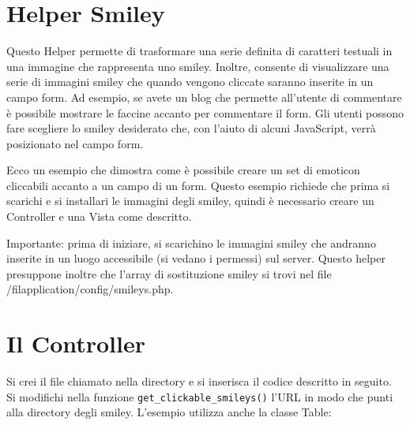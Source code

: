 \section{Helper Smiley}
\label{helper:smiley}

Questo Helper permette di trasformare una serie definita di caratteri testuali in una immagine che rappresenta uno smiley. Inoltre, consente di visualizzare una serie di immagini smiley che quando vengono cliccate saranno inserite in un campo form. Ad esempio, se avete un blog che permette all'utente di commentare è possibile mostrare le faccine accanto per commentare il form. Gli utenti possono fare scegliere lo smiley desiderato che, con l'aiuto di alcuni JavaScript, verrà posizionato nel campo form.

Ecco un esempio che dimostra come è possibile creare un set di emoticon cliccabili accanto a un campo di un form. Questo esempio richiede che prima si scarichi e si installari le immagini degli smiley, quindi è necessario creare un Controller e una Vista come descritto.

Importante: prima di iniziare, si scarichino le immagini smiley che andranno inserite in un luogo accessibile (si vedano i permessi) sul server. Questo helper presuppone inoltre che l'array di sostituzione smiley si trovi nel file /fil{application/config/smileys.php}.

\section*{Il Controller}
Si crei il file chiamato  nella directory  e si inserisca il codice descritto in seguito. Si modifichi nella funzione \verb|get_clickable_smileys()| l'\ac{URL} in modo che punti alla directory degli smiley. L'esempio utilizza anche la classe Table:


